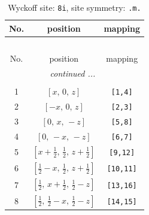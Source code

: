 \documentclass[fleqn,8pt]{jsarticle}
\begin{document}
\begin{longtable}{ccc}
\caption{Wyckoff site: {\tt 8i}, site symmetry: {\tt .m.}}
 \\
 \hline \hline
No. & position & mapping \\ \hline \endfirsthead

\multicolumn{2}{l}{\tablename\ \thetable{}} \\
 \hline \hline
No. & position & mapping \\ \hline \endhead

 \hline \hline
\multicolumn{2}{r}{\footnotesize\it continued ...} \\ \endfoot

 \hline \hline
\multicolumn{2}{r}{} \\ \endlastfoot

1 & $\left[ x,\, 0,\, z \right]$ & {\tt [1,4]} \\ \hline
2 & $\left[ - x,\, 0,\, z \right]$ & {\tt [2,3]} \\ \hline
3 & $\left[ 0,\, x,\, - z \right]$ & {\tt [5,8]} \\ \hline
4 & $\left[ 0,\, - x,\, - z \right]$ & {\tt [6,7]} \\ \hline
5 & $\left[ x + \frac{1}{2},\, \frac{1}{2},\, z + \frac{1}{2} \right]$ & {\tt [9,12]} \\ \hline
6 & $\left[ \frac{1}{2} - x,\, \frac{1}{2},\, z + \frac{1}{2} \right]$ & {\tt [10,11]} \\ \hline
7 & $\left[ \frac{1}{2},\, x + \frac{1}{2},\, \frac{1}{2} - z \right]$ & {\tt [13,16]} \\ \hline
8 & $\left[ \frac{1}{2},\, \frac{1}{2} - x,\, \frac{1}{2} - z \right]$ & {\tt [14,15]} \\
\end{longtable}
\renewcommand{\arraystretch}{1.2}
\end{document}
